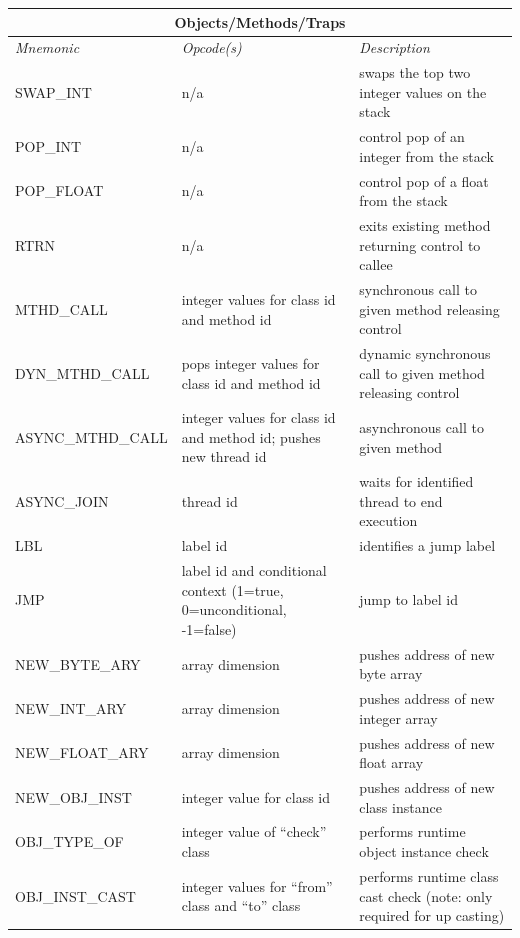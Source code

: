 \documentclass[12pt]{article}
\begin{document}
\begin{center}
  \vspace{\baselineskip}
  \begin{tabular}{| l | p{4 cm} | p{6 cm} |}
    \hline
    \multicolumn{3}{|c|}{\textbf{Objects/Methods/Traps}} \\
    \hline
    \emph{Mnemonic}  &  \emph{Opcode(s)}  &  \emph{Description} \\ \hline \hline
    SWAP\_INT & n/a & swaps the top two integer values on the stack \\ \hline
    POP\_INT & n/a & control pop of an integer from the stack \\ \hline
    POP\_FLOAT & n/a & control pop of a float from the stack \\ \hline
    RTRN & n/a & exits existing method returning control to callee \\ \hline
    MTHD\_CALL & integer values for class id and method id & synchronous call to given method releasing control \\ \hline
    DYN\_MTHD\_CALL & pops integer values for class id and method id & dynamic synchronous call to given method releasing control \\ \hline
    ASYNC\_MTHD\_CALL & integer values for class id and method id; pushes new thread id & asynchronous call to given method \\ \hline
    ASYNC\_JOIN & thread id & waits for identified thread to end execution \\ \hline
    LBL & label id & identifies a jump label \\ \hline
    JMP & label id and conditional context (1=true, 0=unconditional, -1=false) & jump to label id \\ \hline
    NEW\_BYTE\_ARY & array dimension & pushes address of new byte array \\ \hline
    NEW\_INT\_ARY & array dimension & pushes address of new integer array \\ \hline
    NEW\_FLOAT\_ARY & array dimension & pushes address of new float array \\ \hline
    NEW\_OBJ\_INST & integer value for class id & pushes address of new class instance \\ \hline
    OBJ\_TYPE\_OF & integer value of ``check'' class & performs runtime object instance check \\ \hline
    OBJ\_INST\_CAST & integer values for ``from'' class and ``to'' class & performs runtime class cast check (note: only required for up casting) \\ \hline
  \end{tabular}


\end{center}
\end{document}
